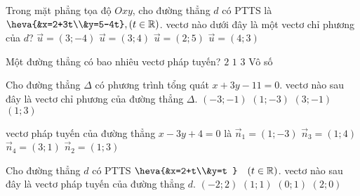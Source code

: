 \begin{ex}%
	Trong mặt phẳng tọa độ $Oxy$, cho đường thẳng $d$ có PTTS là $\heva{&x=2+3t\\&y=5-4t},(t\in\mathbb{R})$. vectơ nào dưới đây là một vectơ chỉ phương của $d$?
	\choice
	{\True $\overrightarrow{u}=(3;-4)$}
	{$\overrightarrow{u}=(3;4)$}
	{$\overrightarrow{u}=(2;5)$}
	{$\overrightarrow{u}=(4;3)$}
\end{ex}


\begin{ex}%
	Một đường thẳng có bao nhiêu vectơ pháp tuyến?
	\choice
	{$ 2 $}
	{$ 1 $}
	{$ 3 $}
	{\True Vô số}
\end{ex}


\begin{ex}%
	Cho đường thẳng $\Delta$ có phương trình tổng quát $x+3y-11=0$. vectơ nào sau đây là vectơ chỉ phương của đường thẳng $\Delta$.
	\choice
	{$(-3;-1)$}
	{$(1;-3)$}
	{\True $(3;-1)$}
	{$(1;3)$}
\end{ex}


\begin{ex}%
	vectơ pháp tuyến của đường thẳng $x-3y+4=0$ là
	\choice
	{\True $\overrightarrow{n}_1=\left(1;-3\right)$}
	{$\overrightarrow{n}_3=\left(1;4\right)$}
	{$\overrightarrow{n}_4=\left(3;1\right)$}
	{$\overrightarrow{n}_2=\left(1;3\right)$}
\end{ex}


\begin{ex}%
	Cho đường thẳng $d$ có PTTS $\heva{&x=2+t\\&y=t }\quad (t\in \mathbb{R})$. vectơ nào sau đây là vectơ pháp tuyến của đường thẳng $d$.
	\choice
	{\True $(-2;2)$}
	{$(1;1)$}
	{$(0;1)$}
	{$(2;0)$}
\end{ex}


